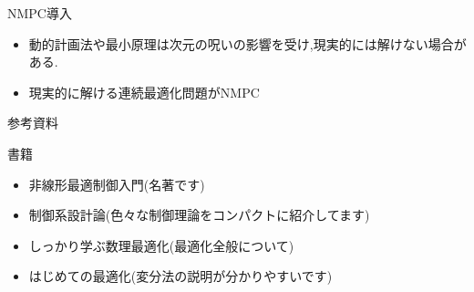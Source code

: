 \documentclass[twocolumn, dvipdfmx,12pt]{beamer}
\begin{document}
    \begin{frame}{NMPC導入}
        \begin{itemize}
            \item 動的計画法や最小原理は次元の呪いの影響を受け,\qquad 現実的には解けない場合がある.
            \item 現実的に解ける連続最適化問題がNMPC
        \end{itemize}
    \end{frame}

    \begin{frame}{参考資料}
        \footnotesize

        書籍\\
        \begin{itemize}
            \item 非線形最適制御入門(名著です)
            \item 制御系設計論(色々な制御理論をコンパクトに紹介してます)
            \item しっかり学ぶ数理最適化(最適化全般について)
            \item はじめての最適化(変分法の説明が分かりやすいです)
        \end{itemize}
    \end{frame}
    
\end{document}
